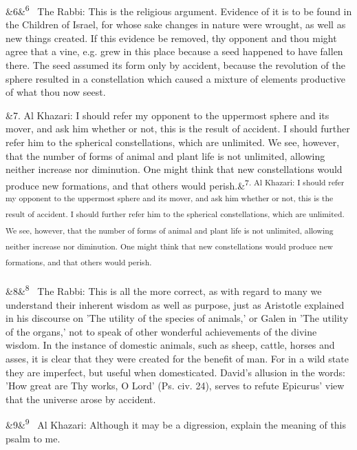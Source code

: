\documentclass[12pt]{article}
\newcommand{\para}[1][]{\par\noindent\ifx&#1&\else\textsuperscript{\footnotesize #1}~\fi}
\begin{document}
\para[6] The Rabbi: This is the religious argument. Evidence of it is to be found in the Children of Israel, for whose sake changes in nature were wrought, as well as new things created. If this evidence be removed, thy opponent and thou might agree that a vine, e.g. grew in this place because a seed happened to have fallen there. The seed assumed its form only by accident, because the revolution of the sphere resulted in a constellation which caused a mixture of elements productive of what thou now seest.

\para [7. Al Khazari: I should refer my opponent to the uppermost sphere and its mover, and ask him whether or not, this is the result of accident. I should further refer him to the spherical constellations, which are unlimited. We see, however, that the number of forms of animal and plant life is not unlimited, allowing neither increase nor diminution. One might think that new constellations would produce new formations, and that others would perish.]

\para[8] The Rabbi: This is all the more correct, as with regard to many we understand their inherent wisdom as well as purpose, just as Aristotle explained in his discourse on 'The utility of the species of animals,' or Galen in 'The utility of the organs,' not to speak of other wonderful achievements of the divine wisdom. In the instance of domestic animals, such as sheep, cattle, horses and asses, it is clear that they were created for the benefit of man. For in a wild state they are imperfect, but useful when domesticated. David's allusion in the words: 'How great are Thy works, O Lord' (Ps. civ. 24), serves to refute Epicurus' view that the universe arose by accident.

\para[9] Al Khazari: Although it may be a digression, explain the meaning of this psalm to me.
\end{document}
